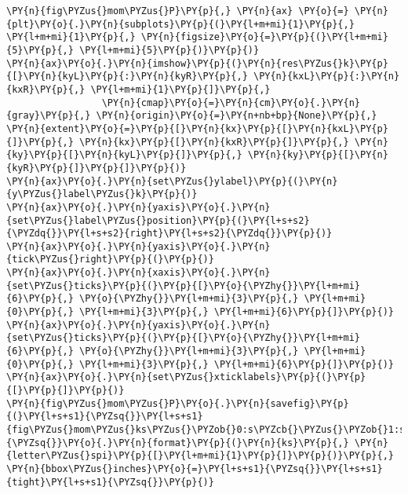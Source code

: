 \begin{Verbatim}[commandchars=\\\{\}]
\PY{n}{fig\PYZus{}mom\PYZus{}P}\PY{p}{,} \PY{n}{ax} \PY{o}{=} \PY{n}{plt}\PY{o}{.}\PY{n}{subplots}\PY{p}{(}\PY{l+m+mi}{1}\PY{p}{,} \PY{l+m+mi}{1}\PY{p}{,} \PY{n}{figsize}\PY{o}{=}\PY{p}{(}\PY{l+m+mi}{5}\PY{p}{,} \PY{l+m+mi}{5}\PY{p}{)}\PY{p}{)}
\PY{n}{ax}\PY{o}{.}\PY{n}{imshow}\PY{p}{(}\PY{n}{res\PYZus{}k}\PY{p}{[}\PY{n}{kyL}\PY{p}{:}\PY{n}{kyR}\PY{p}{,} \PY{n}{kxL}\PY{p}{:}\PY{n}{kxR}\PY{p}{,} \PY{l+m+mi}{1}\PY{p}{]}\PY{p}{,}
                 \PY{n}{cmap}\PY{o}{=}\PY{n}{cm}\PY{o}{.}\PY{n}{gray}\PY{p}{,} \PY{n}{origin}\PY{o}{=}\PY{n+nb+bp}{None}\PY{p}{,} \PY{n}{extent}\PY{o}{=}\PY{p}{[}\PY{n}{kx}\PY{p}{[}\PY{n}{kxL}\PY{p}{]}\PY{p}{,} \PY{n}{kx}\PY{p}{[}\PY{n}{kxR}\PY{p}{]}\PY{p}{,} \PY{n}{ky}\PY{p}{[}\PY{n}{kyL}\PY{p}{]}\PY{p}{,} \PY{n}{ky}\PY{p}{[}\PY{n}{kyR}\PY{p}{]}\PY{p}{]}\PY{p}{)}
\PY{n}{ax}\PY{o}{.}\PY{n}{set\PYZus{}ylabel}\PY{p}{(}\PY{n}{y\PYZus{}label\PYZus{}k}\PY{p}{)}
\PY{n}{ax}\PY{o}{.}\PY{n}{yaxis}\PY{o}{.}\PY{n}{set\PYZus{}label\PYZus{}position}\PY{p}{(}\PY{l+s+s2}{\PYZdq{}}\PY{l+s+s2}{right}\PY{l+s+s2}{\PYZdq{}}\PY{p}{)}
\PY{n}{ax}\PY{o}{.}\PY{n}{yaxis}\PY{o}{.}\PY{n}{tick\PYZus{}right}\PY{p}{(}\PY{p}{)}
\PY{n}{ax}\PY{o}{.}\PY{n}{xaxis}\PY{o}{.}\PY{n}{set\PYZus{}ticks}\PY{p}{(}\PY{p}{[}\PY{o}{\PYZhy{}}\PY{l+m+mi}{6}\PY{p}{,} \PY{o}{\PYZhy{}}\PY{l+m+mi}{3}\PY{p}{,} \PY{l+m+mi}{0}\PY{p}{,} \PY{l+m+mi}{3}\PY{p}{,} \PY{l+m+mi}{6}\PY{p}{]}\PY{p}{)}
\PY{n}{ax}\PY{o}{.}\PY{n}{yaxis}\PY{o}{.}\PY{n}{set\PYZus{}ticks}\PY{p}{(}\PY{p}{[}\PY{o}{\PYZhy{}}\PY{l+m+mi}{6}\PY{p}{,} \PY{o}{\PYZhy{}}\PY{l+m+mi}{3}\PY{p}{,} \PY{l+m+mi}{0}\PY{p}{,} \PY{l+m+mi}{3}\PY{p}{,} \PY{l+m+mi}{6}\PY{p}{]}\PY{p}{)}
\PY{n}{ax}\PY{o}{.}\PY{n}{set\PYZus{}xticklabels}\PY{p}{(}\PY{p}{[}\PY{p}{]}\PY{p}{)}
\PY{n}{fig\PYZus{}mom\PYZus{}P}\PY{o}{.}\PY{n}{savefig}\PY{p}{(}\PY{l+s+s1}{\PYZsq{}}\PY{l+s+s1}{fig\PYZus{}mom\PYZus{}ks\PYZus{}\PYZob{}0:s\PYZcb{}\PYZus{}\PYZob{}1:s\PYZcb{}}\PY{l+s+s1}{\PYZsq{}}\PY{o}{.}\PY{n}{format}\PY{p}{(}\PY{n}{ks}\PY{p}{,} \PY{n}{letter\PYZus{}spi}\PY{p}{[}\PY{l+m+mi}{1}\PY{p}{]}\PY{p}{)}\PY{p}{,} \PY{n}{bbox\PYZus{}inches}\PY{o}{=}\PY{l+s+s1}{\PYZsq{}}\PY{l+s+s1}{tight}\PY{l+s+s1}{\PYZsq{}}\PY{p}{)}


\end{Verbatim}
